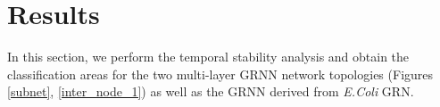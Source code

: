 \documentclass[twocolumn]{biophys-new}
\begin{document}
{{%




 








\section*{Results} \label{results}
In this section, we perform the temporal stability analysis and obtain the classification areas  for the two multi-layer GRNN network topologies (Figures \ref{subnet}, \ref{inter_node_1}) as well as the GRNN derived from \emph{E.Coli} GRN. %


}}
\end{document}
